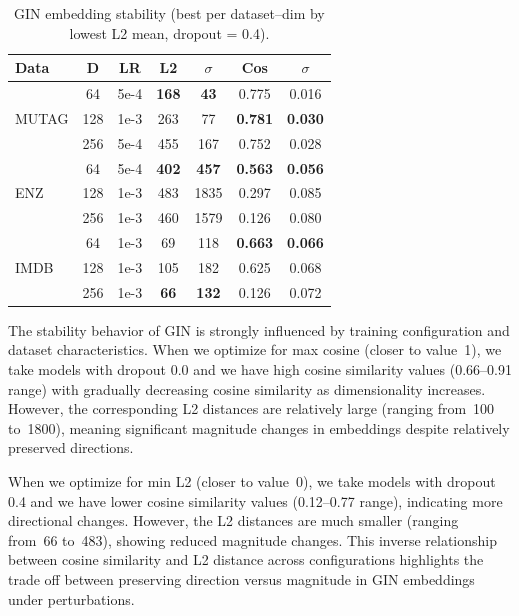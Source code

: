 \begin{table}
\centering
\footnotesize
\setlength{\tabcolsep}{3pt}
\begin{tabular}{l c c c c c c}
\hline
\textbf{Data} & \textbf{D} & \textbf{LR} &
\textbf{L2} & \textbf{$\sigma$} &
\textbf{Cos} & \textbf{$\sigma$} \\
\hline
 & 64  & 5e-4 & \textbf{168} & \textbf{43}  & 0.775 & 0.016 \\
MUTAG & 128 & 1e-3 & 263 & 77  & \textbf{0.781} & \textbf{0.030} \\
 & 256 & 5e-4 & 455 & 167 & 0.752 & 0.028 \\
\hline
   & 64  & 5e-4 & \textbf{402} & \textbf{457} & \textbf{0.563} & \textbf{0.056} \\
ENZ   & 128 & 1e-3 & 483 & 1835& 0.297 & 0.085 \\
  & 256 & 1e-3 & 460 & 1579& 0.126 & 0.080 \\
\hline
  & 64  & 1e-3 & 69  & 118 & \textbf{0.663} & \textbf{0.066} \\
IMDB  & 128 & 1e-3 & 105 & 182 & 0.625 & 0.068 \\
  & 256 & 1e-3 & \textbf{66}  & \textbf{132} & 0.126 & 0.072 \\
\hline
\end{tabular}
\caption{GIN embedding stability (best per dataset--dim by lowest L2 mean, dropout = 0.4).}
\label{tab:stability_gin_best_l2}
\end{table}


The stability behavior of GIN is strongly influenced by training configuration and dataset characteristics.
When we optimize for max  cosine (closer to value~1),
we take models with dropout 0.0 and we have high cosine similarity values (0.66--0.91 range) 
with gradually decreasing cosine similarity as dimensionality increases.
However, the corresponding L2 distances are relatively large (ranging from~100 to~1800),
meaning significant magnitude changes in embeddings despite relatively preserved directions.

When we optimize for min L2 (closer to value~0),
we take models with dropout 0.4 and we have lower cosine similarity values (0.12--0.77 range),
indicating more directional changes.
However, the L2 distances are much smaller (ranging from~66 to~483), showing reduced magnitude changes.
This inverse relationship between cosine similarity and L2 distance across configurations
highlights the trade off between preserving direction versus magnitude in GIN embeddings under perturbations.




